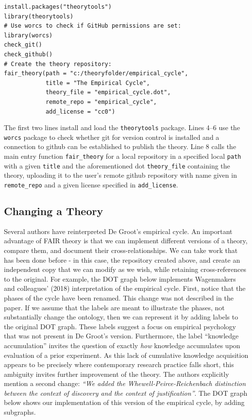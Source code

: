 \documentclass[
  man, noextraspace,floatsintext]{apa6}
\begin{document}
\begin{verbatim}
install.packages("theorytools")
library(theorytools)
# Use worcs to check if GitHub permissions are set:
library(worcs)
check_git()
check_github()
# Create the theory repository:
fair_theory(path = "c:/theoryfolder/empirical_cycle",
            title = "The Empirical Cycle",
            theory_file = "empirical_cycle.dot",
            remote_repo = "empirical_cycle",
            add_license = "cc0")
\end{verbatim}

The first two lines install and load the \texttt{theorytools} package. Lines 4--6 use the \texttt{worcs} package to check whether git for version control is installed and a connection to github can be established to publish the theory. Line 8 calls the main entry function \texttt{fair\_theory} for a local repository in a specified local \texttt{path} with a given \texttt{title} and the aforementioned dot \texttt{theory\_file} containing the theory, uploading it to the user's remote github repository with name given in \texttt{remote\_repo} and a given license specified in \texttt{add\_license}.

\subsection{Changing a Theory}\label{changing-a-theory}

Several authors have reinterpreted De Groot's empirical cycle.
An important advantage of FAIR theory is that we can implement different versions of a theory, compare them, and document their cross-relationships.
We can take work that has been done before - in this case, the repository created above, and create an independent copy that we can modify as we wish, while retaining cross-references to the original.
For example, the DOT graph below implements Wagenmakers and colleagues' (2018) interpretation of the empirical cycle.
First, notice that the phases of the cycle have been renamed.
This change was not described in the paper.
If we assume that the labels are meant to illustrate the phases,
not substantially change the ontology,
then we can represent it by adding labels to the original DOT graph.
These labels suggest a focus on empirical psychology that was not present in De Groot's version.
Furthermore, the label ``knowledge accumulation'' invites the question of exactly \emph{how} knowledge accumulates upon evaluation of a prior experiment.
As this lack of cumulative knowledge acquisition appears to be precisely where contemporary research practice falls short, this ambiguity invites further improvement of the theory.
The authors explicitly mention a second change: \emph{``We added the Whewell-Peirce-Reichenbach distinction between the context of discovery and the context of justification''}.
The DOT graph below shows our implementation of this version of the empirical cycle, by adding subgraphs.
\end{document}
